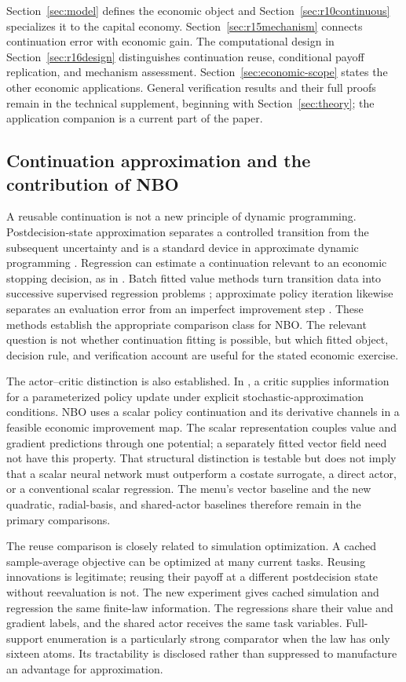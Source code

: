 \documentclass[ecta,nameyear,draft]{econsocart}
\theoremstyle{definition}
\theoremstyle{remark}
\begin{document}
Section~\ref{sec:model} defines the economic object and Section~\ref{sec:r10continuous} specializes it to the capital economy. Section~\ref{sec:r15mechanism} connects continuation error with economic gain. The computational design in Section~\ref{sec:r16design} distinguishes continuation reuse, conditional payoff replication, and mechanism assessment. Section~\ref{sec:economic-scope} states the other economic applications. General verification results and their full proofs remain in the technical supplement, beginning with Section~\ref{sec:theory}; the application companion is a current part of the paper.

\subsection{Continuation approximation and the contribution of NBO}
A reusable continuation is not a new principle of dynamic programming.
Postdecision-state approximation separates a controlled transition from the
subsequent uncertainty and is a standard device in approximate dynamic
programming \citep{powell2011}. Regression can estimate a continuation relevant
to an economic stopping decision, as in \citet{longstaff2001}. Batch fitted
value methods turn transition data into successive supervised regression
problems \citep{ernst2005}; approximate policy iteration likewise separates
an evaluation error from an imperfect improvement step
\citep{scherrer2015}. These methods establish the appropriate comparison
class for NBO. The relevant question is not whether continuation fitting is
possible, but which fitted object, decision rule, and verification account
are useful for the stated economic exercise.

The actor--critic distinction is also established. In
\citet{konda1999}, a critic supplies information for a parameterized policy
update under explicit stochastic-approximation conditions. NBO uses a scalar
policy continuation and its derivative channels in a feasible economic
improvement map. The scalar representation couples value and gradient
predictions through one potential; a separately fitted vector field need
not have this property. That structural distinction is testable but does
not imply that a scalar neural network must outperform a costate surrogate,
a direct actor, or a conventional scalar regression. The menu's vector
baseline and the new quadratic, radial-basis, and shared-actor baselines
therefore remain in the primary comparisons.

The reuse comparison is closely related to simulation optimization. A cached
sample-average objective can be optimized at many current tasks. Reusing
innovations is legitimate; reusing their payoff at a different postdecision
state without reevaluation is not. The new experiment gives cached simulation
and regression the same finite-law information. The regressions share their
value and gradient labels, and the shared actor receives the same task
variables. Full-support enumeration is a particularly strong comparator
when the law has only sixteen atoms. Its tractability is disclosed rather
than suppressed to manufacture an advantage for approximation.
\end{document}
